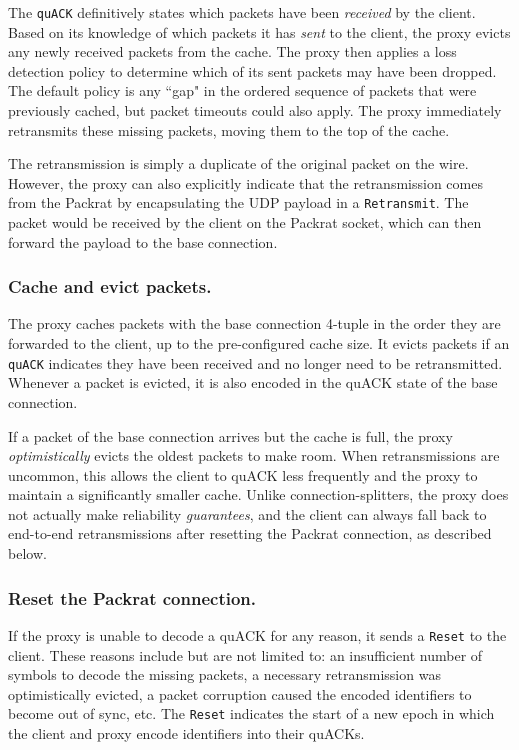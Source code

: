 The \texttt{quACK} definitively states which packets have been \textit{received}
by the client. Based on its knowledge of which packets it has \textit{sent} to
the client, the proxy evicts any newly received packets from the cache. The
proxy then applies a loss detection policy to determine which of its sent
packets may have been dropped. The default
policy is any ``gap" in the ordered sequence of packets that were previously
cached, but packet timeouts could also apply. The proxy immediately retransmits
these missing packets, moving them to the top of the cache.

The retransmission is simply a duplicate of the original packet on the wire.
However, the proxy can also explicitly indicate that the retransmission comes
from the Packrat by encapsulating the UDP payload in a \texttt{Retransmit}. The
packet would be received by the client on the Packrat socket, which can then forward
the payload to the base connection.

\subsubsection{Cache and evict packets.}

The proxy caches packets with the base connection 4-tuple in the order they are
forwarded to the client, up to the pre-configured cache size. It evicts packets
if an \texttt{quACK} indicates they have been received and no longer need to be
retransmitted. Whenever a packet is evicted, it is also encoded in the quACK
state of the base connection.

If a packet of the base connection arrives but the cache is full, the
proxy \textit{optimistically} evicts the oldest packets to make room. When
retransmissions are uncommon, this allows the client to quACK less frequently
and the proxy to maintain a significantly smaller cache. Unlike
connection-splitters, the proxy does not actually make reliability \textit
{guarantees}, and the client can always fall back to end-to-end retransmissions
after resetting the Packrat connection, as described below.

\subsubsection{Reset the Packrat connection.}

If the proxy is unable to decode a quACK for any reason, it sends a \texttt
{Reset} to the client. These reasons include but are not limited to: an
insufficient number of symbols to decode the missing packets, a necessary
retransmission was optimistically evicted,
a packet corruption caused the encoded identifiers
to become out of sync, etc. The \texttt{Reset} indicates the start of a new
epoch in which the client and proxy encode identifiers into their quACKs.

